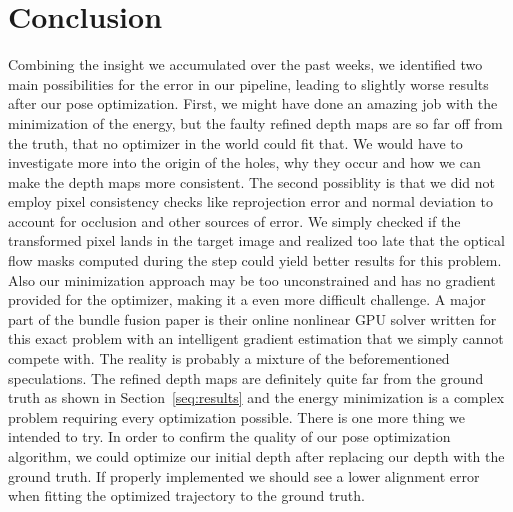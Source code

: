 \chapter{Conclusion}
    Combining the insight we accumulated over the past weeks, we identified two main possibilities for the error in our pipeline, leading to slightly worse results after our pose optimization.
    First, we might have done an amazing job with the minimization of the energy, but the faulty refined depth maps are so far off from the truth, that no optimizer in the world could fit that.
    We would have to investigate more into the origin of the holes, why they occur and how we can make the depth maps more consistent.
    The second possiblity is that we did not employ pixel consistency checks like reprojection error and normal deviation to account for occlusion and other sources of error.
    We simply checked if the transformed pixel lands in the target image and realized too late that the optical flow masks computed during the  step could yield better results for this problem.
    Also our minimization approach may be too unconstrained and has no gradient provided for the optimizer, making it a even more difficult challenge.
    A major part of the bundle fusion paper is their online nonlinear GPU solver written for this exact problem with an intelligent gradient estimation that we simply cannot compete with.
    The reality is probably a mixture of the beforementioned speculations.
    The refined depth maps are definitely quite far from the ground truth as shown in Section~\ref{seq:results} and the energy minimization is a complex problem requiring every optimization possible.
    There is one more thing we intended to try.
    In order to confirm the quality of our pose optimization algorithm, we could optimize our initial depth after replacing our depth with the ground truth.
    If properly implemented we should see a lower alignment error when fitting the optimized trajectory to the ground truth.

